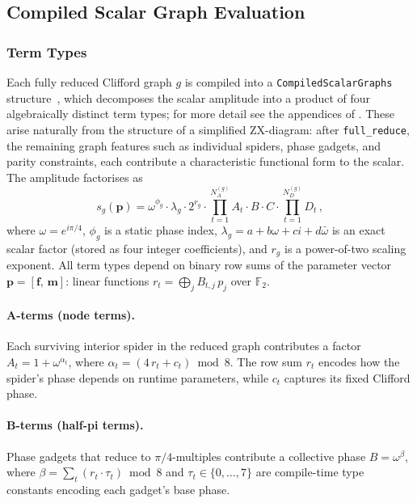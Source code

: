 \documentclass[a4paper,onecolumn,11pt,accepted=2026-06-10]{quantumarticle}
\begin{document}
\subsection{Compiled Scalar Graph Evaluation}
\label{sec:compiled-eval}

\subsubsection{Term Types}
\label{sec:term-types}

Each fully reduced Clifford graph $g$ is compiled into a
\texttt{CompiledScalarGraphs}
structure~\cite{sutcliffe2024fast}, which
decomposes the scalar amplitude into a product of four algebraically distinct term types; for more detail see the appendices of \cite{sutcliffe2024fast}. These arise naturally from the structure of a simplified ZX-diagram: after \texttt{full\_reduce}, the remaining graph features such as individual spiders, phase gadgets, and parity constraints, each contribute a characteristic functional form to the scalar. The amplitude factorises as
\begin{equation}
\label{eq:scalar-amplitude}
    s_g(\mathbf{p})
    = \omega^{\phi_g} \cdot \lambda_g \cdot 2^{r_g}
      \cdot \prod_{t=1}^{N_A^{(g)}} \!A_t
      \cdot B
      \cdot C
      \cdot \prod_{t=1}^{N_D^{(g)}} \!D_t\,,
\end{equation}
where $\omega = e^{i\pi/4}$, $\phi_g$ is a static phase index, $\lambda_g = a + b\omega + ci + d\bar\omega$ is an exact scalar factor (stored as four integer coefficients), and $r_g$ is a power-of-two scaling exponent. All term types depend on binary row sums of the parameter vector $\mathbf{p} = [\mathbf{f},\, \mathbf{m}]$: linear functions $r_t = \bigoplus_j B_{t,j}\, p_j$ over $\mathbb{F}_2$.

\paragraph{A-terms (node terms).}
Each surviving interior spider in the reduced graph contributes a factor
$A_t = 1 + \omega^{\alpha_t}$, where
$\alpha_t = (4\, r_t + c_t) \bmod 8$. The row sum $r_t$ encodes how the
spider's phase depends on runtime parameters, while $c_t$ captures its
fixed Clifford phase.

\paragraph{B-terms (half-pi terms).}
Phase gadgets that reduce to $\pi/4$-multiples contribute a collective
phase $B = \omega^{\beta}$, where
$\beta = \sum_t (r_t \cdot \tau_t) \bmod 8$ and
$\tau_t \in \{0,\ldots,7\}$ are compile-time type constants encoding
each gadget's base phase.
\end{document}
